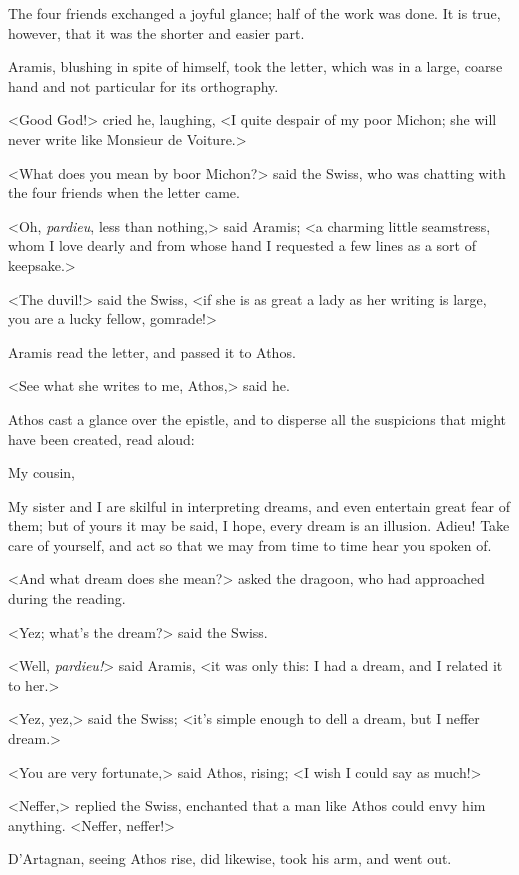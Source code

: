 The four friends exchanged a joyful glance; half of the work was done. It is true, however, that it was the shorter and easier part. 

Aramis, blushing in spite of himself, took the letter, which was in a large, coarse hand and not particular for its orthography. 

<Good God!> cried he, laughing, <I quite despair of my poor Michon; she will never write like Monsieur de Voiture.> 

<What does you mean by boor Michon?> said the Swiss, who was chatting with the four friends when the letter came. 

<Oh, \textit{pardieu}, less than nothing,> said Aramis; <a charming little seamstress, whom I love dearly and from whose hand I requested a few lines as a sort of keepsake.> 

<The duvil!> said the Swiss, <if she is as great a lady as her writing is large, you are a lucky fellow, gomrade!> 

Aramis read the letter, and passed it to Athos. 

<See what she writes to me, Athos,> said he. 

Athos cast a glance over the epistle, and to disperse all the suspicions that might have been created, read aloud: 
\begin{mail}{}{My cousin,} 
	
	My sister and I are skilful in interpreting dreams, and even entertain great fear of them; but of yours it may be said, I hope, every dream is an illusion. Adieu! Take care of yourself, and act so that we may from time to time hear you spoken of. 
	
	\end{mail}

<And what dream does she mean?> asked the dragoon, who had approached during the reading. 

<Yez; what's the dream?> said the Swiss. 

<Well, \textit{pardieu!}> said Aramis, <it was only this: I had a dream, and I related it to her.> 

<Yez, yez,> said the Swiss; <it's simple enough to dell a dream, but I neffer dream.> 

<You are very fortunate,> said Athos, rising; <I wish I could say as much!> 

<Neffer,> replied the Swiss, enchanted that a man like Athos could envy him anything. <Neffer, neffer!> 

D'Artagnan, seeing Athos rise, did likewise, took his arm, and went out. 

